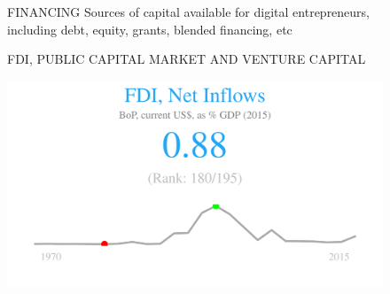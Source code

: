 \documentclass{article}\usepackage[]{graphicx}\usepackage[]{color}
\makeatletter
\def\maxwidth{ %
  \ifdim\Gin@nat@width>\linewidth
    \linewidth
  \else
    \Gin@nat@width
  \fi
}
\makeatother
\begin{document}
\begin{figure}
\vspace*{-27.5cm}
\hspace*{+1cm}
\begin{minipage}[c]{0.95\textwidth}
  \begin{minipage}[c]{0.95\textwidth}
    \begin{flushleft}  
     \Large{\textcolor[HTML]{22A6F5}{FINANCING}} \hspace{2ex}\small{\textcolor[HTML]{818181} {Sources of capital available for digital entrepreneurs, including debt, equity, grants, blended financing, etc}}
    \end{flushleft} 
     \small{\textcolor[HTML]{818181}{FDI, PUBLIC CAPITAL MARKET AND VENTURE CAPITAL}}
      \\[4pt]
      \begin{minipage}[c]{0.32\textwidth}  


{\centering \includegraphics[width=\maxwidth]{figure/figure_sparkline_Fin1-1} 

}



      \end{minipage}
      \begin{minipage}[c]{0.32\textwidth}



\end{minipage}
\end{minipage}
\end{minipage}
\end{figure}
\end{document}

